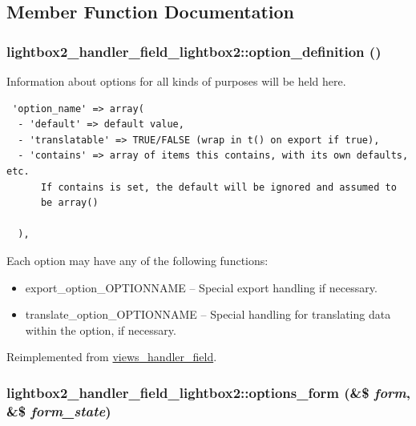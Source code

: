 \subsection{Member Function Documentation}
\hypertarget{classlightbox2__handler__field__lightbox2_641e7b72ac54a1c6baf7fd2bd6424438}{
\subsubsection[{option\_\-definition}]{\setlength{\rightskip}{0pt plus 5cm}lightbox2\_\-handler\_\-field\_\-lightbox2::option\_\-definition ()}}
\label{classlightbox2__handler__field__lightbox2_641e7b72ac54a1c6baf7fd2bd6424438}


Information about options for all kinds of purposes will be held here. 

\begin{Code}\begin{verbatim} 'option_name' => array(
  - 'default' => default value,
  - 'translatable' => TRUE/FALSE (wrap in t() on export if true),
  - 'contains' => array of items this contains, with its own defaults, etc.
      If contains is set, the default will be ignored and assumed to
      be array()

  ),
\end{verbatim}
\end{Code}

 Each option may have any of the following functions:\begin{itemize}
\item export\_\-option\_\-OPTIONNAME -- Special export handling if necessary.\item translate\_\-option\_\-OPTIONNAME -- Special handling for translating data within the option, if necessary. \end{itemize}


Reimplemented from \hyperlink{classviews__handler__field_64c69a8a3697603f8283405071c25b76}{views\_\-handler\_\-field}.\hypertarget{classlightbox2__handler__field__lightbox2_6e0462dcba8bb237b822be3d844ed24b}{
\subsubsection[{options\_\-form}]{\setlength{\rightskip}{0pt plus 5cm}lightbox2\_\-handler\_\-field\_\-lightbox2::options\_\-form (\&\$ {\em form}, \/  \&\$ {\em form\_\-state})}}
\label{classlightbox2__handler__field__lightbox2_6e0462dcba8bb237b822be3d844ed24b}


